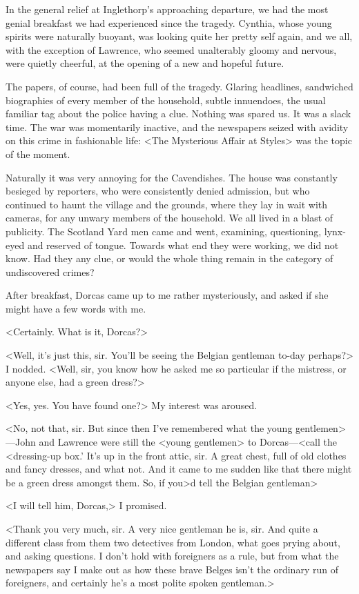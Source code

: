  In the general relief at Inglethorp's approaching departure, we had the most genial breakfast we had experienced since the tragedy. Cynthia, whose young spirits were naturally buoyant, was looking quite her pretty self again, and we all, with the exception of Lawrence, who seemed unalterably gloomy and nervous, were quietly cheerful, at the opening of a new and hopeful future. 

 The papers, of course, had been full of the tragedy. Glaring headlines, sandwiched biographies of every member of the household, subtle innuendoes, the usual familiar tag about the police having a clue. Nothing was spared us. It was a slack time. The war was momentarily inactive, and the newspapers seized with avidity on this crime in fashionable life: <The Mysterious Affair at Styles> was the topic of the moment. 

 Naturally it was very annoying for the Cavendishes. The house was constantly besieged by reporters, who were consistently denied admission, but who continued to haunt the village and the grounds, where they lay in wait with cameras, for any unwary members of the household. We all lived in a blast of publicity. The Scotland Yard men came and went, examining, questioning, lynx-eyed and reserved of tongue. Towards what end they were working, we did not know. Had they any clue, or would the whole thing remain in the category of undiscovered crimes? 

 After breakfast, Dorcas came up to me rather mysteriously, and asked if she might have a few words with me. 

 <Certainly. What is it, Dorcas?> 

 <Well, it's just this, sir. You'll be seeing the Belgian gentleman to-day perhaps?> I nodded. <Well, sir, you know how he asked me so particular if the mistress, or anyone else, had a green dress?> 

 <Yes, yes. You have found one?> My interest was aroused. 

 <No, not that, sir. But since then I've remembered what the young gentlemen>—John and Lawrence were still the <young gentlemen> to Dorcas—<call the <dressing-up box.' It's up in the front attic, sir. A great chest, full of old clothes and fancy dresses, and what not. And it came to me sudden like that there might be a green dress amongst them. So, if you>d tell the Belgian gentleman\longdash> 

 <I will tell him, Dorcas,> I promised. 

 <Thank you very much, sir. A very nice gentleman he is, sir. And quite a different class from them two detectives from London, what goes prying about, and asking questions. I don't hold with foreigners as a rule, but from what the newspapers say I make out as how these brave Belges isn't the ordinary run of foreigners, and certainly he's a most polite spoken gentleman.> 

